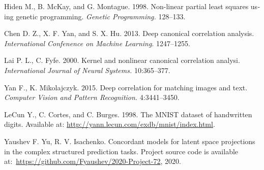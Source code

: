 \documentclass[12pt]{article}
\begin{document}
\begin{otherlanguage}{english}
\begin{thebibliography}{99}
Hiden M., B. McKay, and G. Montague. 1998. Non-linear partial least squares using genetic programming. \textit{Genetic Programming.} 128--133.

Chen D. Z., X. F. Yan, and S. X. Hu. 2013. Deep canonical correlation analysis. \textit{International Confenence on Machine Learning}. 1247--1255.

Lai P. L., C. Fyfe. 2000. Kernel and nonlinear canonical correlation analysi. \textit{International Journal of Neural Systems.} 10:365--377.

Yan F., K. Mikolajczyk. 2015. Deep correlation for matching images and text. \textit{Computer Vision and Pattern Recognition.} 4:3441--3450.

LeCun Y., C. Cortes, and C. Burges. 1998. The MNIST dataset of handwritten digits. Available at: \url{http://yann.lecun.com/exdb/mnist/index.html}.

Yaushev F. Yu, R. V. Isachenko. Concordant models for latent space projections in the complex structured prediction tasks. Project source code is available at:~\url{https://github.com/Fyaushev/2020-Project-72}, 2020.
		
\end{thebibliography}
\end{otherlanguage}
\end{document}
